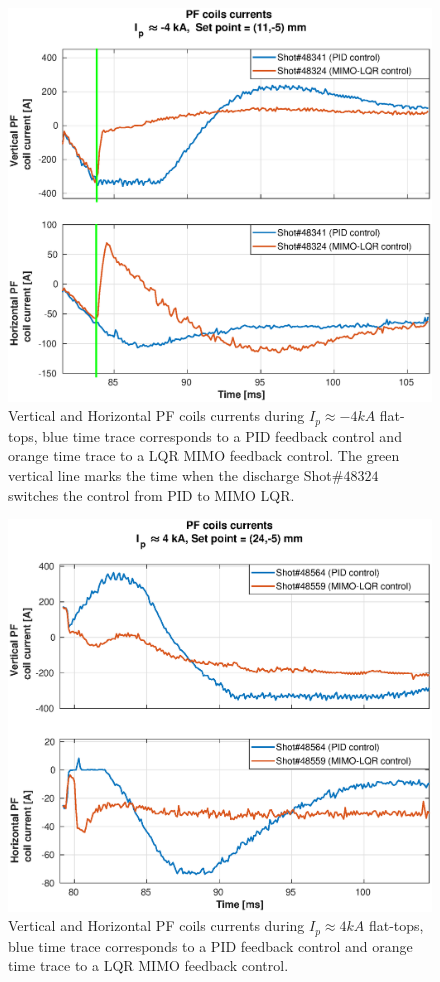 \begin{figure}[h]
 	\centering
 	\includegraphics[width=1.1\textwidth]{Chp5/PIDvsMIMO_341_324_curr_2.eps}
 	\caption{ Vertical and Horizontal PF coils currents during  $I_p\approx -4kA$  flat-tops, blue time trace corresponds to a PID feedback control and orange time trace to a LQR MIMO feedback control. The green vertical line marks the time  when the  discharge Shot$\# 48324$ switches the control from PID to MIMO LQR. \label{341_342_curr}}
 \end{figure}
 


\begin{figure}[h]
	\centering
	\includegraphics[width=1.1\textwidth]{Chp5/PIDvsMIMO_564_559_curr_2.eps}
	\caption{Vertical and Horizontal PF coils currents during  $I_p\approx 4kA$  flat-tops, blue time trace corresponds to a PID feedback control and orange time trace to a LQR MIMO feedback control.\label{564_559curr}}
\end{figure}


